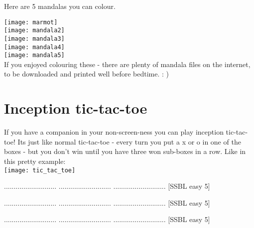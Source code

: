 \documentclass{article}
\begin{document}
Here are 5 mandalas you can colour.
\vspace{3cm}
\setlength{}
\setlength\evensidemargin{\oddsidemargin}

\texttt{[image: marmot]}
\\
\texttt{[image: mandala2]}
\\
\texttt{[image: mandala3]}
\\
\texttt{[image: mandala4]}
\\
\texttt{[image: mandala5]}
\\
If you enjoyed colouring these - there are plenty of mandala files on the internet, to be downloaded and printed well before bedtime. : )
\newpage
\section{Inception tic-tac-toe}
If you have a companion in your non-screen-ness you can play inception tic-tac-toe!
Its just like normal tic-tac-toe - every turn you put a x or o in one of the boxes - but you don't win until you have three won sub-boxes in a row.
Like in this pretty example:
\\
\texttt{[image: tic\_tac\_toe]}

\renewcommand*{\puzzlefile}{se5.sud}
\writepuzzle%
{.........}{.........}{.........}%
{.........}{.........}{.........}%
{.........}{.........}{.........}%
[SSBL easy 5]
\vfill
\begin{minipage}{0.95\linewidth}\begin{center}
\end{center}\end{minipage}

\renewcommand*{\puzzlefile}{se5.sud}
\writepuzzle%
{.........}{.........}{.........}%
{.........}{.........}{.........}%
{.........}{.........}{.........}%
[SSBL easy 5]
\vfill
\begin{minipage}{0.95\linewidth}\begin{center}
\end{center}\end{minipage}

\renewcommand*{\puzzlefile}{se5.sud}
\writepuzzle%
{.........}{.........}{.........}%
{.........}{.........}{.........}%
{.........}{.........}{.........}%
[SSBL easy 5]
\vfill
\begin{minipage}{0.95\linewidth}\begin{center}
\end{center}\end{minipage}
\end{document}
